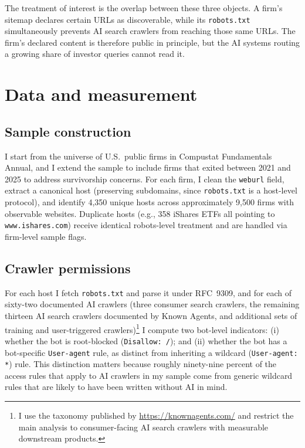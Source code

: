 \documentclass[11pt]{article}
\begin{document}
The treatment of interest is the overlap between these three objects. A
firm's sitemap declares certain URLs as discoverable, while its
\texttt{robots.txt} simultaneously prevents AI search crawlers from reaching
those same URLs. The firm's declared content is therefore public in principle,
but the AI systems routing a growing share of investor queries cannot read it.

\section{Data and measurement}

\subsection{Sample construction}

I start from the universe of U.S.~public firms in Compustat Fundamentals
Annual, and I extend the sample to include firms that exited between 2021
and 2025 to address survivorship concerns. For each firm, I clean the
\texttt{weburl} field, extract a canonical host (preserving subdomains, since
\texttt{robots.txt} is a host-level protocol), and identify 4{,}350 unique
hosts across approximately 9{,}500 firms with observable websites. Duplicate
hosts (e.g., 358 iShares ETFs all pointing to \texttt{www.ishares.com})
receive identical robots-level treatment and are handled via firm-level
sample flags.

\subsection{Crawler permissions}

For each host I fetch \texttt{robots.txt} and parse it under RFC~9309, and
for each of sixty-two documented AI crawlers (three consumer search crawlers,
the remaining thirteen AI search crawlers documented by Known Agents, and
additional sets of training and user-triggered crawlers)\footnote{I use the
taxonomy published by \url{https://knownagents.com/} and restrict the main
analysis to consumer-facing AI search crawlers with measurable downstream
products.} I compute two bot-level indicators: (i) whether the bot is
root-blocked (\texttt{Disallow: /}); and (ii) whether the bot has a
bot-specific \texttt{User-agent} rule, as distinct from inheriting a wildcard
(\texttt{User-agent: *}) rule. This distinction matters because roughly
ninety-nine percent of the access rules that apply to AI crawlers in my
sample come from generic wildcard rules that are likely to have been written
without AI in mind.
\end{document}
